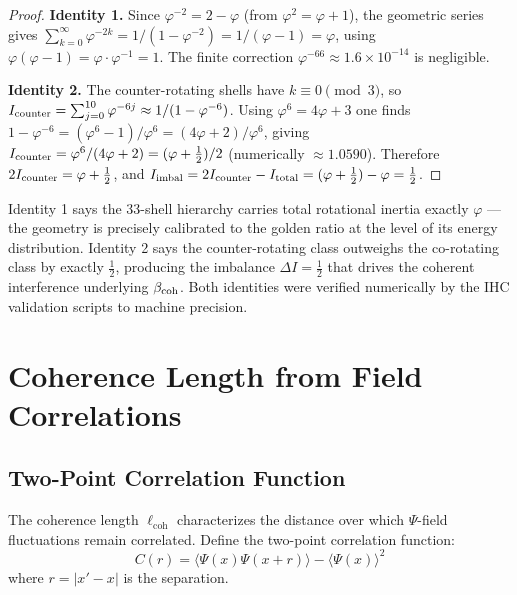 \begin{proof}
\textbf{Identity 1.}
Since $\varphi^{-2} = 2 - \varphi$ (from $\varphi^2 = \varphi + 1$), the geometric series gives
$\sum_{k=0}^{\infty}\varphi^{-2k} = 1/(1-\varphi^{-2}) = 1/(\varphi-1) = \varphi$,
using $\varphi(\varphi-1) = \varphi \cdot \varphi^{-1} = 1$.
The finite correction $\varphi^{-66} \approx 1.6\times10^{-14}$ is negligible.

\textbf{Identity 2.}
The counter-rotating shells have $k \equiv 0 \pmod 3$, so
$I_{\rm counter} = \sum_{j=0}^{10}\varphi^{-6j} \approx 1/(1-\varphi^{-6})$.
Using $\varphi^6 = 4\varphi+3$ one finds $1-\varphi^{-6} = (\varphi^6-1)/\varphi^6 = (4\varphi+2)/\varphi^6$,
giving $I_{\rm counter} = \varphi^6/(4\varphi+2) = (\varphi+\tfrac{1}{2})/2$ (numerically $\approx 1.0590$).
Therefore $2I_{\rm counter} = \varphi + \tfrac{1}{2}$,
and $I_{\rm imbal} = 2I_{\rm counter} - I_{\rm total} = (\varphi + \tfrac{1}{2}) - \varphi = \tfrac{1}{2}$.
\end{proof}

\begin{remark}
Identity 1 says the 33-shell hierarchy carries total rotational inertia exactly $\varphi$
--- the geometry is precisely calibrated to the golden ratio at the level of its energy distribution.
Identity 2 says the counter-rotating class outweighs the co-rotating class by exactly $\tfrac{1}{2}$,
producing the imbalance $\Delta I = \tfrac{1}{2}$ that drives the coherent interference
underlying $\beta_{\rm coh}$.
Both identities were verified numerically by the IHC validation scripts
\citep{Peacock2026a} to machine precision.
\end{remark}

\section{Coherence Length from Field Correlations}

\subsection{Two-Point Correlation Function}

The coherence length $\ell_{\text{coh}}$ characterizes the distance over which $\Psi$-field fluctuations remain correlated. Define the two-point correlation function:
\begin{equation}
C(r) = \langle \Psi(x)\Psi(x+r) \rangle - \langle \Psi(x) \rangle^2
\end{equation}
where $r = |x' - x|$ is the separation.

